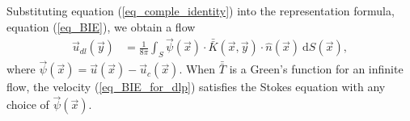 Substituting equation (\ref{eq_comple_identity}) into the representation formula, equation (\ref{eq_BIE}), we obtain a flow
\begin{align}
   \vec{u}_{dl}(\vec{y}) & =
	\frac{1}{8 \pi } \int_S  
	\vec{\psi}(\vec{x})
	\cdot  \bar{\bar{K}}(\vec{x},\vec{y})  
	\cdot \hat{n} ( \vec{x})
	\ \text{d}S(\vec{x}),
\label{eq_BIE_for_dlp}
\end{align}
where $
	\vec{\psi}(\vec{x}) =    \vec{u}(\vec{x})  - \vec{u}_c (\vec{x})$.
When $\bar{\bar{T }}$ is a Green's function for an infinite flow, the velocity (\ref{eq_BIE_for_dlp}) satisfies the Stokes equation with any choice of $\vec{\psi}(\vec{x}) $.
\par


